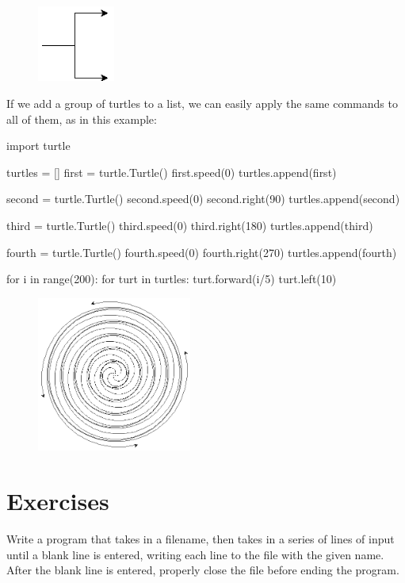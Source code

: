 \documentclass[11pt]{cselabheader}
\begin{document}
\begin{figure}[h]
  \centering
  \includegraphics[width=1.0in]{img/turtle_prong}
\end{figure}

If we add a group of turtles to a list, we can easily apply the same commands to all of them, as in this example:

\begin{python3code}
import turtle

turtles = []
first = turtle.Turtle()
first.speed(0)
turtles.append(first)

second = turtle.Turtle()
second.speed(0)
second.right(90)
turtles.append(second)

third = turtle.Turtle()
third.speed(0)
third.right(180)
turtles.append(third)

fourth = turtle.Turtle()
fourth.speed(0)
fourth.right(270)
turtles.append(fourth)

for i in range(200):
    for turt in turtles:
        turt.forward(i/5)
        turt.left(10)
\end{python3code}

\begin{figure}[h]
  \centering
  \includegraphics[width=2.0in]{img/fancy_spiral}
\end{figure}

\pagebreak
\section{Exercises}
\label{sec:ex}

\begin{ex}[save.py] Write a program that takes in a filename, then takes in
  a series of lines of input until a blank line is entered, writing each line to
  the file with the given name. After the blank line is entered, properly close
  the file before ending the program.  
\end{ex}
\end{document}
